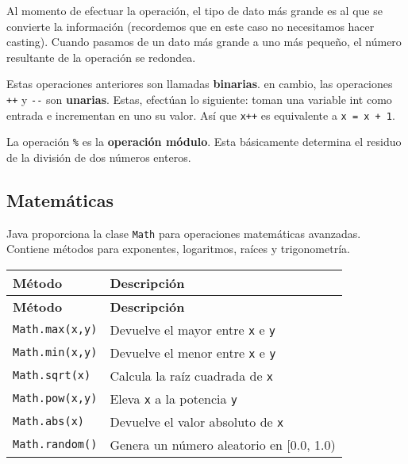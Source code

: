\documentclass[12pt]{article}
\theoremstyle{largebreak}
\begin{document}
    \begin{obs}
        Al momento de efectuar la operación, el tipo de dato más grande es al que se convierte la información (recordemos que en este caso no necesitamos hacer casting). Cuando pasamos de un dato más grande a uno más pequeño, el número resultante de la operación se redondea.
    \end{obs}

    Estas operaciones anteriores son llamadas \textbf{binarias}. en cambio, las operaciones \lstinline|++| y \lstinline|--| son \textbf{unarias}. Estas, efectúan lo siguiente: toman una variable int como entrada e incrementan en uno su valor. Así que \lstinline|x++| es equivalente a \lstinline|x = x + 1|.

    La operación \lstinline|%| es la \textbf{operación módulo}. Esta básicamente determina el residuo de la división de dos números enteros.

    \subsection{Matemáticas}

    Java proporciona la clase \lstinline|Math| para operaciones matemáticas avanzadas. Contiene métodos para exponentes, logaritmos, raíces y trigonometría.

    \begin{longtable}{l p{}}
        \toprule
        \textbf{Método} & \textbf{Descripción} \\
        \midrule
        \endfirsthead

        \midrule
        \textbf{Método} & \textbf{Descripción} \\
        \midrule
        \endhead

        \bottomrule
        \endfoot

        \lstinline|Math.max(x,y)| & Devuelve el mayor entre \lstinline|x| e \lstinline|y| \\
        \lstinline|Math.min(x,y)| & Devuelve el menor entre \lstinline|x| e \lstinline|y| \\
        \lstinline|Math.sqrt(x)| & Calcula la raíz cuadrada de \lstinline|x| \\
        \lstinline|Math.pow(x,y)| & Eleva \lstinline|x| a la potencia \lstinline|y| \\
        \lstinline|Math.abs(x)| & Devuelve el valor absoluto de \lstinline|x| \\
        \lstinline|Math.random()| & Genera un número aleatorio en [0.0, 1.0) \\
    \end{longtable}
\end{document}
